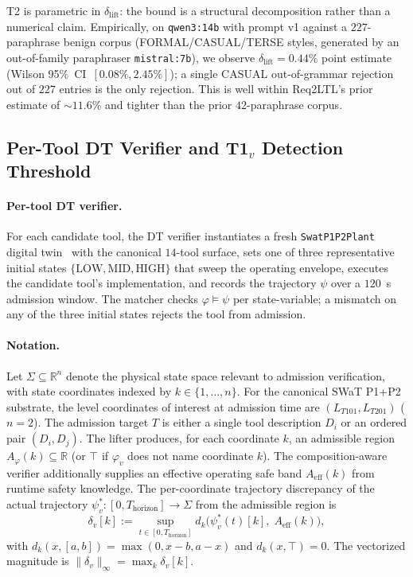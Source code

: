T2 is parametric in $\delta_{\text{lift}}$: the bound is a structural
decomposition rather than a numerical claim. Empirically, on
\texttt{qwen3:14b} with prompt v1 against a $227$-paraphrase benign
corpus (FORMAL/CASUAL/TERSE styles, generated by an out-of-family
paraphraser \texttt{mistral:7b}), we observe $\delta_{\text{lift}} =
0.44\%$ point estimate (Wilson 95\%~CI~$[0.08\%, 2.45\%]$); a single
CASUAL out-of-grammar rejection out of $227$ entries is the only
rejection. This is well within Req2LTL's prior estimate of
$\sim 11.6\%$ and tighter than the prior $42$-paraphrase corpus.

\subsection{Per-Tool DT Verifier and T1${}_v$ Detection Threshold}
\label{sec:design-dt}

\paragraph{Per-tool DT verifier.}
For each candidate tool, the DT verifier instantiates a fresh
\texttt{SwatP1P2Plant} digital twin~\cite{minicps} with the canonical
$14$-tool surface, sets one of three representative initial states
$\{\text{LOW}, \text{MID}, \text{HIGH}\}$ that sweep the operating
envelope, executes the candidate tool's implementation, and records
the trajectory $\psi$ over a $120$~s admission window. The matcher
checks $\varphi \models \psi$ per state-variable; a mismatch on any
of the three initial states rejects the tool from admission.

\paragraph{Notation.}
Let $\Sigma \subseteq \mathbb{R}^n$ denote the physical state space
relevant to admission verification, with state coordinates indexed by
$k \in \{1, \dots, n\}$. For the canonical SWaT P1+P2 substrate, the
level coordinates of interest at admission time are $(L_{T101},
L_{T201})$ ($n=2$). The admission target $T$ is either a single tool
description $D_i$ or an ordered pair $(D_i, D_j)$. The lifter
produces, for each coordinate $k$, an admissible region
$A_\varphi(k) \subseteq \mathbb{R}$ (or $\top$ if $\varphi_v$ does not
name coordinate $k$). The composition-aware verifier additionally
supplies an effective operating safe band $A_{\text{eff}}(k)$ from
runtime safety knowledge. The per-coordinate trajectory discrepancy
of the actual trajectory $\psi_v^{*}: [0, T_{\text{horizon}}] \to
\Sigma$ from the admissible region is
\[
\delta_v[k] := \sup_{t \in [0, T_{\text{horizon}}]}
   d_k\!\bigl(\psi_v^{*}(t)[k],\; A_{\text{eff}}(k)\bigr),
\]
with $d_k(x, [a,b]) = \max(0, x-b, a-x)$ and $d_k(x, \top) = 0$. The
vectorized magnitude is $\|\delta_v\|_\infty = \max_k \delta_v[k]$.

